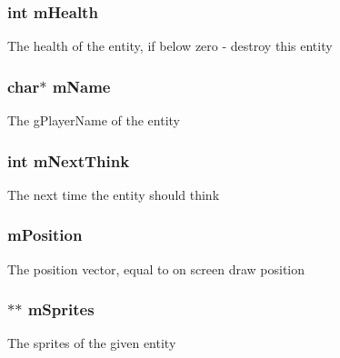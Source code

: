 \subsubsection[{\texorpdfstring{m\+Health}{mHealth}}]{\setlength{\rightskip}{0pt plus 5cm}int m\+Health}\hypertarget{structentity__s_a709ed9fa7e17bcc63f51b9e011772aee}{}\label{structentity__s_a709ed9fa7e17bcc63f51b9e011772aee}
The health of the entity, if below zero -\/ destroy this entity 
\subsubsection[{\texorpdfstring{m\+Name}{mName}}]{\setlength{\rightskip}{0pt plus 5cm}char$\ast$ m\+Name}\hypertarget{structentity__s_ad5201d7f075979ee60c684961d6a4ead}{}\label{structentity__s_ad5201d7f075979ee60c684961d6a4ead}
The g\+Player\+Name of the entity 
\subsubsection[{\texorpdfstring{m\+Next\+Think}{mNextThink}}]{\setlength{\rightskip}{0pt plus 5cm}int m\+Next\+Think}\hypertarget{structentity__s_a24bdc1525ed5bcbf2a8c7027c9e1db5f}{}\label{structentity__s_a24bdc1525ed5bcbf2a8c7027c9e1db5f}
The next time the entity should think 
\subsubsection[{\texorpdfstring{m\+Position}{mPosition}}]{ m\+Position}\hypertarget{structentity__s_af80cb24cef46274686528f461642ba50}{}\label{structentity__s_af80cb24cef46274686528f461642ba50}
The position vector, equal to on screen draw position 
\subsubsection[{\texorpdfstring{m\+Sprites}{mSprites}}]{$\ast$$\ast$ m\+Sprites}\hypertarget{structentity__s_ad454ff27c8d769254a727750ac38592f}{}\label{structentity__s_ad454ff27c8d769254a727750ac38592f}
The sprites of the given entity 
